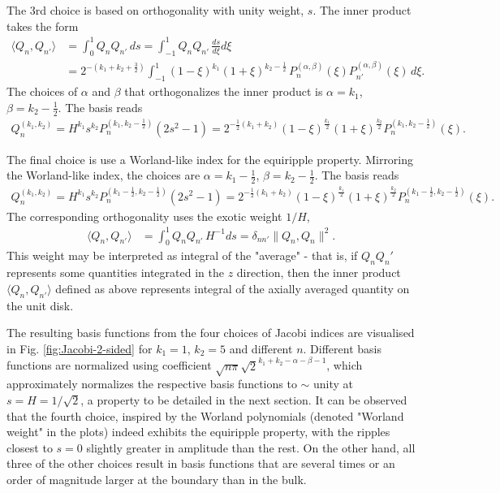 The 3rd choice is based on orthogonality with unity weight, $s$. The inner product takes the form
%
\[\begin{aligned}
    \langle Q_n, Q_{n'} \rangle &= \int_{0}^1 Q_n Q_{n'}\, ds = \int_{-1}^1 Q_n Q_{n'} \, \frac{ds}{d\xi} d\xi \\ 
    &= 2^{-\left(k_1 + k_2 + \frac{3}{2}\right)} \int_{-1}^{1} (1 - \xi)^{k_1} (1 + \xi)^{k_2 - \frac{1}{2}} \, P_n^{(\alpha, \beta)}(\xi) P_{n'}^{(\alpha, \beta)}(\xi) \, d\xi.
\end{aligned}\]
%
The choices of $\alpha$ and $\beta$ that orthogonalizes the inner product is $\alpha = k_1$, $\beta = k_2 - \frac{1}{2}$. The basis reads
%
\begin{equation}
\begin{aligned}
    Q_n^{(k_1, k_2)} = H^{k_1} s^{k_2} P_n^{(k_1, k_2 - \frac{1}{2})}(2s^2 - 1) = 2^{-\frac{1}{2}(k_1 + k_2)} (1 - \xi)^{\frac{k_1}{2}} (1 + \xi)^{\frac{k_2}{2}} P_n^{(k_1, k_2 - \frac{1}{2})}(\xi).
\end{aligned}
\end{equation}
%

The final choice is use a Worland-like index for the equiripple property. Mirroring the Worland-like index, the choices are $\alpha = k_1 - \frac{1}{2}$, $\beta = k_2 - \frac{1}{2}$. The basis reads
%
\begin{equation}\label{eqn:Jacobi-2-sided-Worland}
\begin{aligned}
    Q_n^{(k_1, k_2)} = H^{k_1} s^{k_2} P_n^{(k_1 - \frac{1}{2}, k_2 - \frac{1}{2})}(2s^2 - 1) = 2^{-\frac{1}{2}(k_1 + k_2)} (1 - \xi)^{\frac{k_1}{2}} (1 + \xi)^{\frac{k_2}{2}} P_n^{(k_1 - \frac{1}{2}, k_2 - \frac{1}{2})}(\xi).
\end{aligned}
\end{equation}
%
The corresponding orthogonality uses the exotic weight $1/H$,
%
\[\begin{aligned}
    \langle Q_n, Q_{n'} \rangle &= \int_{0}^1 Q_n Q_{n'}\, H^{-1} ds = \delta_{nn'} \| Q_n, Q_n \|^2.
\end{aligned}\]
%
This weight may be interpreted as integral of the "average" - that is, if $Q_n Q_n'$ represents some quantities integrated in the $z$ direction, then the inner product $\langle Q_n, Q_{n'} \rangle$ defined as above represents integral of the axially averaged quantity on the unit disk.

The resulting basis functions from the four choices of Jacobi indices are visualised in Fig. \ref{fig:Jacobi-2-sided} for $k_1=1$, $k_2=5$ and different $n$. Different basis functions are normalized using coefficient $\sqrt{n\pi} \sqrt{2}^{k_1 + k_2 - \alpha - \beta - 1}$, which approximately normalizes the respective basis functions to $\sim$ unity at $s=H=1/\sqrt{2}$, a property to be detailed in the next section.
It can be observed that the fourth choice, inspired by the Worland polynomials (denoted "Worland weight" in the plots) indeed exhibits the equiripple property, with the ripples closest to $s=0$ slightly greater in amplitude than the rest.
On the other hand, all three of the other choices result in basis functions that are several times or an order of magnitude larger at the boundary than in the bulk.

